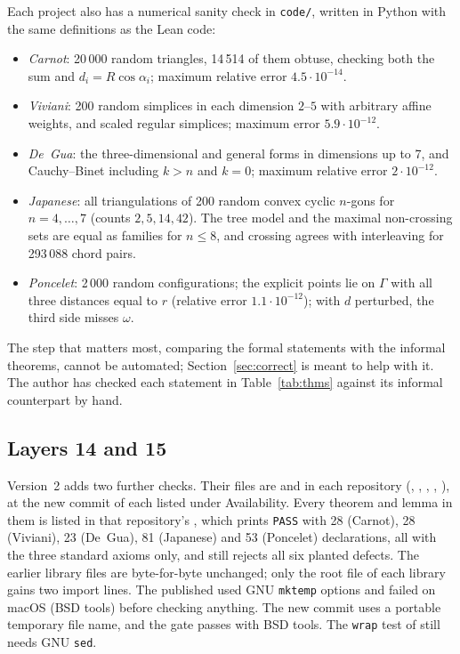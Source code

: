 \documentclass[11pt]{article}
\theoremstyle{definition}
\theoremstyle{remark}
\newcommand{\code}[1]{\texttt{#1}}
\begin{document}
Each project also has a numerical sanity check in \texttt{code/}, written in Python with the same
definitions as the Lean code:
\begin{itemize}
\item \emph{Carnot}: 20\,000 random triangles, 14\,514 of them obtuse, checking both the sum and
$d_i=R\cos\alpha_i$; maximum relative error $4.5\cdot10^{-14}$.
\item \emph{Viviani}: 200 random simplices in each dimension $2$--$5$ with arbitrary affine
weights, and scaled regular simplices; maximum error $5.9\cdot10^{-12}$.
\item \emph{De~Gua}: the three-dimensional and general forms in dimensions up to 7, and
Cauchy--Binet including $k>n$ and $k=0$; maximum relative error $2\cdot10^{-12}$.
\item \emph{Japanese}: all triangulations of 200 random convex cyclic $n$-gons for $n=4,\dots,7$
(counts $2,5,14,42$). The tree model and the maximal non-crossing sets are equal as families for
$n\le8$, and crossing agrees with interleaving for 293\,088 chord pairs.
\item \emph{Poncelet}: 2\,000 random configurations; the explicit points lie on $\Gamma$ with all
three distances equal to $r$ (relative error $1.1\cdot10^{-12}$); with $d$ perturbed, the third
side misses $\omega$.
\end{itemize}

The step that matters most, comparing the formal statements with the informal theorems, cannot be
automated; Section~\ref{sec:correct} is meant to help with it.
The author has checked each statement in Table~\ref{tab:thms} against its informal counterpart by hand.

\subsection{Layers 14 and 15}\label{sec:l1415}

Version~2 adds two further checks. Their files are  and
 in each repository (, , ,
, ), at the new commit of each listed under Availability. Every theorem and lemma
in them is listed in that repository's , which prints \code{PASS} with 28 (Carnot),
28 (Viviani), 23 (De~Gua), 81 (Japanese) and 53 (Poncelet) declarations, all with the three standard
axioms only, and  still rejects all six planted defects. The earlier library
files are byte-for-byte unchanged; only the root file of each library gains two import lines.
The published  used GNU \code{mktemp} options and failed on macOS (BSD tools) before
checking anything. The new commit uses a portable temporary file name, and the gate passes with BSD
tools. The \code{wrap} test of  still needs GNU \code{sed}.
\end{document}

